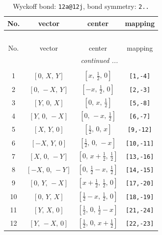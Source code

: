 \documentclass[fleqn,8pt]{jsarticle}
\begin{document}
\begin{longtable}{cccc}
\caption{Wyckoff bond: {\tt 12a@12j}, bond symmetry: {\tt 2..}}
 \\
 \hline \hline
No. & vector & center & mapping \\ \hline \endfirsthead

\multicolumn{3}{l}{\tablename\ \thetable{}} \\
 \hline \hline
No. & vector & center & mapping \\ \hline \endhead

 \hline \hline
\multicolumn{3}{r}{\footnotesize\it continued ...} \\ \endfoot

 \hline \hline
\multicolumn{3}{r}{} \\ \endlastfoot

1 & $\left[ 0,\, X,\, Y \right]$ & $\left[ x,\, \frac{1}{2},\, 0 \right]$ & {\tt [1,-4]} \\ \hline
2 & $\left[ 0,\, - X,\, Y \right]$ & $\left[ - x,\, \frac{1}{2},\, 0 \right]$ & {\tt [2,-3]} \\ \hline
3 & $\left[ Y,\, 0,\, X \right]$ & $\left[ 0,\, x,\, \frac{1}{2} \right]$ & {\tt [5,-8]} \\ \hline
4 & $\left[ Y,\, 0,\, - X \right]$ & $\left[ 0,\, - x,\, \frac{1}{2} \right]$ & {\tt [6,-7]} \\ \hline
5 & $\left[ X,\, Y,\, 0 \right]$ & $\left[ \frac{1}{2},\, 0,\, x \right]$ & {\tt [9,-12]} \\ \hline
6 & $\left[ - X,\, Y,\, 0 \right]$ & $\left[ \frac{1}{2},\, 0,\, - x \right]$ & {\tt [10,-11]} \\ \hline
7 & $\left[ X,\, 0,\, - Y \right]$ & $\left[ 0,\, x + \frac{1}{2},\, \frac{1}{2} \right]$ & {\tt [13,-16]} \\ \hline
8 & $\left[ - X,\, 0,\, - Y \right]$ & $\left[ 0,\, \frac{1}{2} - x,\, \frac{1}{2} \right]$ & {\tt [14,-15]} \\ \hline
9 & $\left[ 0,\, Y,\, - X \right]$ & $\left[ x + \frac{1}{2},\, \frac{1}{2},\, 0 \right]$ & {\tt [17,-20]} \\ \hline
10 & $\left[ 0,\, Y,\, X \right]$ & $\left[ \frac{1}{2} - x,\, \frac{1}{2},\, 0 \right]$ & {\tt [18,-19]} \\ \hline
11 & $\left[ Y,\, X,\, 0 \right]$ & $\left[ \frac{1}{2},\, 0,\, \frac{1}{2} - x \right]$ & {\tt [21,-24]} \\ \hline
12 & $\left[ Y,\, - X,\, 0 \right]$ & $\left[ \frac{1}{2},\, 0,\, x + \frac{1}{2} \right]$ & {\tt [22,-23]} \\
\end{longtable}
\end{document}
